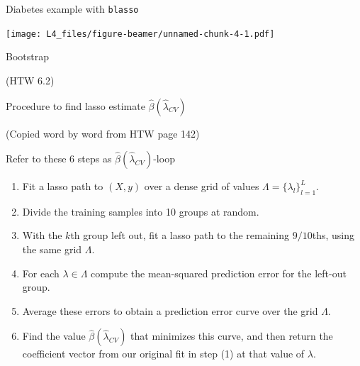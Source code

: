 \documentclass[
  ignorenonframetext,
]{beamer}
\newenvironment{Shaded}{\begin{snugshade}}{\end{snugshade}}
\newcommand{\CommentTok}[1]{\textcolor[rgb]{0.56,0.35,0.01}{\textit{#1}}}
\newcommand{\DataTypeTok}[1]{\textcolor[rgb]{0.13,0.29,0.53}{#1}}
\newcommand{\DecValTok}[1]{\textcolor[rgb]{0.00,0.00,0.81}{#1}}
\newcommand{\KeywordTok}[1]{\textcolor[rgb]{0.13,0.29,0.53}{\textbf{#1}}}
\newcommand{\NormalTok}[1]{#1}
\newcommand{\OperatorTok}[1]{\textcolor[rgb]{0.81,0.36,0.00}{\textbf{#1}}}
\newcommand{\StringTok}[1]{\textcolor[rgb]{0.31,0.60,0.02}{#1}}
\providecommand{\tightlist}{%
  \setlength{\itemsep}{0pt}\setlength{\parskip}{0pt}}
\begin{document}
\begin{frame}[fragile]
\begin{block}{Diabetes example with \texttt{blasso}}
\begin{Shaded}
\end{Shaded}

\texttt{[image: L4\_files/figure-beamer/unnamed-chunk-4-1.pdf]}

\end{block}

\end{frame}

\begin{frame}{Bootstrap}
\protect\hypertarget{bootstrap}{}

(HTW 6.2)

\end{frame}

\begin{frame}

\begin{block}{Procedure to find lasso estimate
\(\hat{\beta}(\hat{\lambda}_{CV})\)}

(Copied word by word from HTW page 142)

Refer to these 6 steps as \(\hat{\beta}(\hat{\lambda}_{CV})\)-loop

\begin{enumerate}
\tightlist
\item
  Fit a lasso path to \((X, y)\) over a dense grid of values
  \(\Lambda=\{\lambda_l\}_{l=1}^{L}\).
\item
  Divide the training samples into 10 groups at random.
\item
  With the \(k\)th group left out, fit a lasso path to the remaining
  \(9/10\)ths, using the same grid \(\Lambda\).
\item
  For each \(\lambda \in \Lambda\) compute the mean-squared prediction
  error for the left-out group.
\item
  Average these errors to obtain a prediction error curve over the grid
  \(\Lambda\).
\item
  Find the value \(\hat{\beta}(\hat{\lambda}_{CV})\) that minimizes this
  curve, and then return the coefficient vector from our original fit in
  step (1) at that value of \(\lambda\).
\end{enumerate}

\end{block}

\end{frame}
\end{document}
